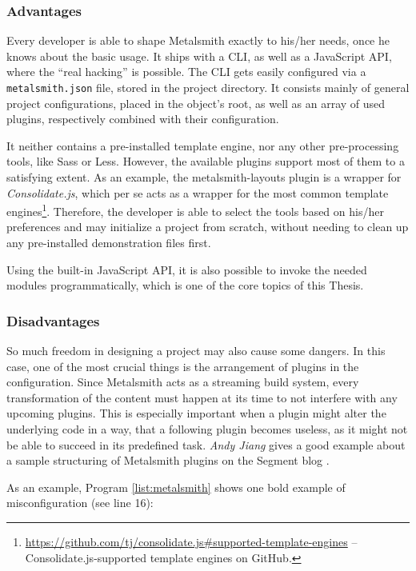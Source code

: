 \subsubsection{Advantages}
Every developer is able to shape Metalsmith exactly to his/her needs, once he knows about the basic usage. It ships with a CLI, as well as a JavaScript API, where the ``real hacking'' is possible. The CLI gets easily configured via a \texttt{metalsmith.json} file, stored in the project directory. It consists mainly of general project configurations, placed in the object's root, as well as an array of used plugins, respectively combined with their configuration.

It neither contains a pre-installed template engine, nor any other pre-processing tools, like Sass or Less. However, the available plugins support most of them to a satisfying extent. As an example, the metalsmith-layouts plugin is a wrapper for \emph{Consolidate.js}, which per se acts as a wrapper for the most common template engines\footnote{\url{https://github.com/tj/consolidate.js\#supported-template-engines} -- Consolidate.js-supported template engines on GitHub.}. Therefore, the developer is able to select the tools based on his/her preferences and may initialize a project from scratch, without needing to clean up any pre-installed demonstration files first.

Using the built-in JavaScript API, it is also possible to invoke the needed modules programmatically, which is one of the core topics of this Thesis.

\subsubsection{Disadvantages}
So much freedom in designing a project may also cause some dangers. In this case, one of the most crucial things is the arrangement of plugins in the configuration. Since Metalsmith acts as a streaming build system, every transformation of the content must happen at its time to not interfere with any upcoming plugins. This is especially important when a plugin might alter the underlying code in a way, that a following plugin becomes useless, as it might not be able to succeed in its predefined task. \emph{Andy Jiang} gives a good example about a sample structuring of Metalsmith plugins on the Segment blog \cite{Metalsmith2015technicaldocumentation}.

As an example, Program \ref{list:metalsmith} shows one bold example of misconfiguration (see line 16):

